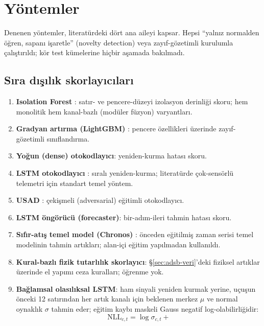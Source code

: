 \documentclass[11pt,a4paper]{article}
\begin{document}
\section{Yöntemler}
\label{sec:yontem}

Denenen yöntemler, literatürdeki dört ana aileyi kapsar. Hepsi ``yalnız
normalden öğren, sapanı işaretle'' (novelty detection) veya zayıf-gözetimli
kurulumla çalıştırıldı; kör test kümelerine hiçbir aşamada bakılmadı.

\subsection{Sıra dışılık skorlayıcıları}

\begin{enumerate}[itemsep=3pt]
  \item \textbf{Isolation Forest} \cite{liu2008iforest}: satır- ve
        pencere-düzeyi izolasyon derinliği skoru; hem monolitik hem kanal-bazlı
        (modüler füzyon) varyantları.
  \item \textbf{Gradyan artırma (LightGBM)} \cite{ke2017lightgbm}:
        pencere özellikleri üzerinde zayıf-gözetimli sınıflandırma.
  \item \textbf{Yoğun (dense) otokodlayıcı}: yeniden-kurma hatası skoru.
  \item \textbf{LSTM otokodlayıcı} \cite{malhotra2016lstm}: sıralı
        yeniden-kurma; literatürde çok-sensörlü telemetri için standart temel
        yöntem.
  \item \textbf{USAD} \cite{audibert2020usad}: çekişmeli (adversarial) eğitimli
        otokodlayıcı.
  \item \textbf{LSTM öngörücü (forecaster)}: bir-adım-ileri tahmin hatası
        skoru.
  \item \textbf{Sıfır-atış temel model (Chronos)} \cite{ansari2024chronos}:
        önceden eğitilmiş zaman serisi temel modelinin tahmin artıkları;
        alan-içi eğitim yapılmadan kullanıldı.
  \item \textbf{Kural-bazlı fizik tutarlılık skorlayıcı}: \S\ref{sec:adsb-veri}'deki
        fiziksel artıklar üzerinde el yapımı ceza kuralları; öğrenme yok.
  \item \textbf{Bağlamsal olasılıksal LSTM}: ham sinyali yeniden kurmak yerine,
        uçuşun önceki 12 satırından her artık kanalı için beklenen merkez
        $\mu$ ve normal oynaklık $\sigma$ tahmin eder; eğitim kaybı maskeli
        Gauss negatif log-olabilirliğidir:
        \[
        \mathrm{NLL}_{c,t} = \log \sigma_{c,t} +
\]
\end{enumerate}
\end{document}
